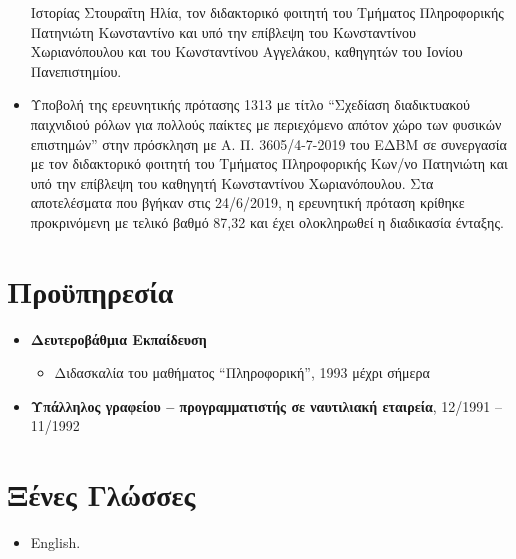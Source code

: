 \documentclass[%
    11pt,
  oneside
  ]{memoir}
\let\oldsection\section
\renewcommand{\section}[1]{%
  \oldsection{#1}
  \leavevmode
  \par
  \vspace{\dimexpr-\baselineskip-\parskip}
}
\begin{document}
\begin{itemize}
  Ιστορίας Στουραΐτη Ηλία, τον διδακτορικό φοιτητή του Tμήματος
  Πληροφορικής Πατηνιώτη Κωνσταντίνο και υπό την επίβλεψη του
  Κωνσταντίνου Χωριανόπουλου και του Κωνσταντίνου Αγγελάκου, καθηγητών
  του Ιονίου Πανεπιστημίου.
\item
  Υποβολή της ερευνητικής πρότασης 1313 με τίτλο ``Σχεδίαση διαδικτυακού
  παιχνιδιού ρόλων για πολλούς παίκτες με περιεχόμενο απότον χώρο των
  φυσικών επιστημών'' στην πρόσκληση με Α. Π. 3605/4-7-2019 του ΕΔΒΜ σε
  συνεργασία με τον διδακτορικό φοιτητή του Τμήματος Πληροφορικής Κων/νο
  Πατηνιώτη και υπό την επίβλεψη του καθηγητή Κωνσταντίνου
  Χωριανόπουλου. Στα αποτελέσματα που βγήκαν στις 24/6/2019, η
  ερευνητική πρόταση κρίθηκε προκρινόμενη με τελικό βαθμό 87,32 και έχει
  ολοκληρωθεί η διαδικασία ένταξης.
\end{itemize}

\hypertarget{ux3c0ux3c1ux3bfux3cbux3c0ux3b7ux3c1ux3b5ux3c3ux3afux3b1}{%
\section{Προϋπηρεσία}\label{ux3c0ux3c1ux3bfux3cbux3c0ux3b7ux3c1ux3b5ux3c3ux3afux3b1}}

\begin{itemize}
\tightlist
\item
  \textbf{Δευτεροβάθμια Εκπαίδευση}

  \begin{itemize}
  \tightlist
  \item
    Διδασκαλία του μαθήματος ``Πληροφορική'', 1993 μέχρι σήμερα
  \end{itemize}
\item
  \textbf{Υπάλληλος γραφείου -- προγραμματιστής σε ναυτιλιακή εταιρεία},
  12/1991 -- 11/1992
\end{itemize}

\hypertarget{ux3beux3adux3bdux3b5ux3c2-ux3b3ux3bbux3ceux3c3ux3c3ux3b5ux3c2}{%
\section{Ξένες
Γλώσσες}\label{ux3beux3adux3bdux3b5ux3c2-ux3b3ux3bbux3ceux3c3ux3c3ux3b5ux3c2}}

\begin{itemize}
\tightlist
\item
  English.
\end{itemize}
\end{document}
